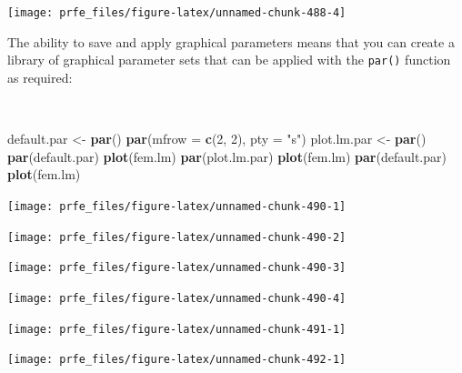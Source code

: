 \documentclass[12pt,a4paper]{book}
\newenvironment{Shaded}{\begin{snugshade}}{\end{snugshade}}
\newcommand{\DataTypeTok}[1]{\textcolor[rgb]{0.13,0.29,0.53}{#1}}
\newcommand{\DecValTok}[1]{\textcolor[rgb]{0.00,0.00,0.81}{#1}}
\newcommand{\KeywordTok}[1]{\textcolor[rgb]{0.13,0.29,0.53}{\textbf{#1}}}
\newcommand{\NormalTok}[1]{#1}
\newcommand{\StringTok}[1]{\textcolor[rgb]{0.31,0.60,0.02}{#1}}
\theoremstyle{definition}
\theoremstyle{definition}
\theoremstyle{definition}
\theoremstyle{remark}
\begin{document}
\begin{center}\texttt{[image: prfe\_files/figure-latex/unnamed-chunk-488-4]} \end{center}

\newpage

The ability to save and apply graphical parameters means that you can
create a library of graphical parameter sets that can be applied with
the \texttt{par()} function as required:

~

\begin{Shaded}
\begin{Highlighting}[]
\NormalTok{default.par <-}\StringTok{ }\KeywordTok{par}\NormalTok{()}
\KeywordTok{par}\NormalTok{(}\DataTypeTok{mfrow =} \KeywordTok{c}\NormalTok{(}\DecValTok{2}\NormalTok{, }\DecValTok{2}\NormalTok{), }\DataTypeTok{pty =} \StringTok{"s"}\NormalTok{)}
\NormalTok{plot.lm.par <-}\StringTok{ }\KeywordTok{par}\NormalTok{()}
\KeywordTok{par}\NormalTok{(default.par)}
\KeywordTok{plot}\NormalTok{(fem.lm)}
\KeywordTok{par}\NormalTok{(plot.lm.par)}
\KeywordTok{plot}\NormalTok{(fem.lm)}
\KeywordTok{par}\NormalTok{(default.par)}
\KeywordTok{plot}\NormalTok{(fem.lm)}
\end{Highlighting}
\end{Shaded}

\newpage

\begin{center}\texttt{[image: prfe\_files/figure-latex/unnamed-chunk-490-1]} \end{center}

\begin{center}\texttt{[image: prfe\_files/figure-latex/unnamed-chunk-490-2]} \end{center}

\begin{center}\texttt{[image: prfe\_files/figure-latex/unnamed-chunk-490-3]} \end{center}

\begin{center}\texttt{[image: prfe\_files/figure-latex/unnamed-chunk-490-4]} \end{center}

\newpage

\begin{center}\texttt{[image: prfe\_files/figure-latex/unnamed-chunk-491-1]} \end{center}

\newpage

\begin{center}\texttt{[image: prfe\_files/figure-latex/unnamed-chunk-492-1]} \end{center}
\end{document}
